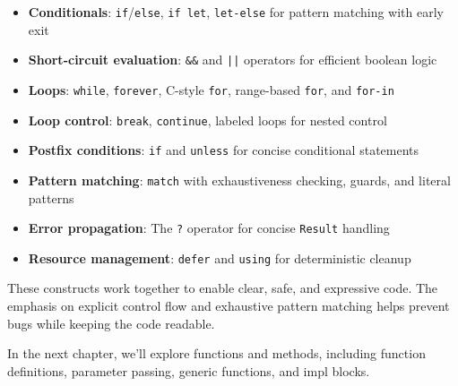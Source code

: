 \begin{itemize}
    \item \textbf{Conditionals}: \texttt{if}/\texttt{else}, \texttt{if let}, \texttt{let-else} for pattern matching with early exit
    \item \textbf{Short-circuit evaluation}: \texttt{\&\&} and \texttt{||} operators for efficient boolean logic
    \item \textbf{Loops}: \texttt{while}, \texttt{forever}, C-style \texttt{for}, range-based \texttt{for}, and \texttt{for-in}
    \item \textbf{Loop control}: \texttt{break}, \texttt{continue}, labeled loops for nested control
    \item \textbf{Postfix conditions}: \texttt{if} and \texttt{unless} for concise conditional statements
    \item \textbf{Pattern matching}: \texttt{match} with exhaustiveness checking, guards, and literal patterns
    \item \textbf{Error propagation}: The \texttt{?} operator for concise \texttt{Result} handling
    \item \textbf{Resource management}: \texttt{defer} and \texttt{using} for deterministic cleanup
\end{itemize}

These constructs work together to enable clear, safe, and expressive code. The emphasis on explicit control flow and exhaustive pattern matching helps prevent bugs while keeping the code readable.

In the next chapter, we'll explore functions and methods, including function definitions, parameter passing, generic functions, and impl blocks.
